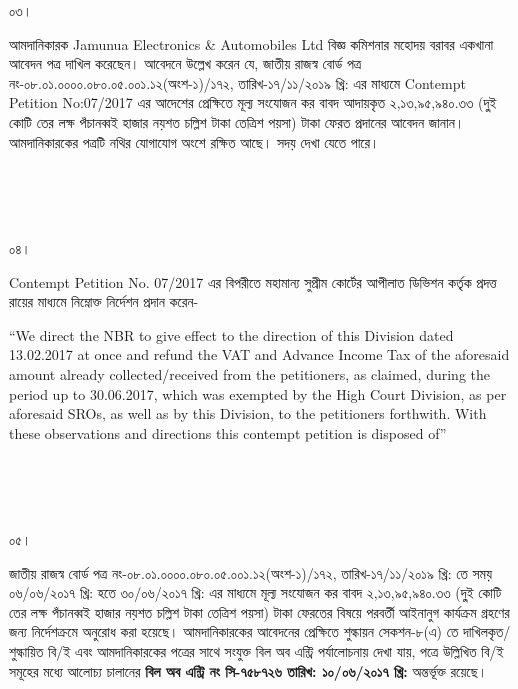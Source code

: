 \documentclass[12pt]{article}
\newcommand{\nbrl}{নং-০৮.০১.০০০০.০৮০.০৫.০০১.১২(অংশ-১)/১৭২, তারিখ-১৭/১১/২০১৯ খ্রি:}
\newcommand{\tvat}{২,১৩,৯৫,৯৪০.৩৩ (দু্ই কোটি তের লক্ষ পঁচানব্বই হাজার নয়শত চল্লিশ টাকা তেত্রিশ পয়সা) টাকা}
\newcommand{\tl}{০৬/০৬/২০১৭ খ্রি: হতে ৩০/০৬/২০১৭ খ্রি:}
\newcommand{\cno}{৭৫৮৭২৬}
\newcommand{\dt}{১০/০৬/২০১৭}
\begin{document}
\begin{minipage}[t]{0.05\linewidth}
০৩।
\end{minipage}
\begin{minipage}[t]{1\linewidth}
আমদানিকারক
Jamunua Electronics \& Automobiles Ltd
বিজ্ঞ কমিশনার মহোদয় বরাবর
একখানা আবেদন পত্র দাখিল
করেছেন। আবেদনে উল্লেখ করেন যে,
জাতীয় রাজস্ব বোর্ড পত্র
{\nbrl} এর মাধ্যমে
Contempt Petition No:07/2017
এর আদেশের প্রেক্ষিতে মূল্য সংযোজন কর
বাবদ আদায়কৃত
{\tvat} ফেরত প্রদানের আবেদন জানান।
আমদানিকারকের পত্রটি নথির যোগাযোগ
অংশে রক্ষিত আছে।
সদয় দেখা যেতে পারে।
\end{minipage}
\\
\\
\\
\begin{minipage}[t]{0.05\linewidth}
০৪।
\end{minipage}
\begin{minipage}[t]{1\linewidth}
Contempt Petition No. 07/2017
এর বিপরীতে মহামান্য সুপ্রীম কোর্টের
আপীলাত ডিভিশন কর্তৃক প্রদত্ত রায়ের
মাধ্যমে নিম্নোক্ত নির্দেশন প্রদান করেন-


\hspace{1em}``We direct the NBR
to give effect to the direction
of this Division
dated 13.02.2017
at once and refund the VAT
and Advance Income Tax
of the aforesaid amount already
collected/received from the
petitioners, as claimed, during
the period up to 30.06.2017,
which was exempted by the
High Court Division, as per
aforesaid SROs, as well as by this
Division, to the  petitioners
forthwith. With these observations
and directions this contempt
petition is disposed of''
\end{minipage}
\\
\\
\\
\begin{minipage}[t]{0.05\linewidth}
০৫।
\end{minipage}
\begin{minipage}[t]{1\linewidth}
জাতীয় রাজস্ব বোর্ড পত্র
{\nbrl} তে সময়
{\tl} এর মাধ্যমে মূল্য সংযোজন কর বাবদ
{\tvat} ফেরতের বিষয়ে পরবর্তী
আইনানুগ কার্যক্রম গ্রহণের জন্য
নির্দেশক্রমে অনুরোধ করা হয়েছে।
আমদানিকারকের আবেদনের প্রেক্ষিতে শুল্কায়ন
সেকশন-৮(এ) তে দাখিলকৃত/শুল্কায়িত
বি/ই এবং আমদানিকারকের
পত্রের সাথে সংযুক্ত বিল অব এন্ট্রি
পর্যালোচনায় দেখা যায়,
পত্রে উল্লিখিত বি/ই সমূহের
মধ্যে আলোচ্য চালানের
\textbf{বিল অব এন্ট্রি নং সি-{\cno} তারিখ: {\dt} খ্রি:} অন্তর্ভূক্ত রয়েছে।
\end{minipage}
\end{document}

